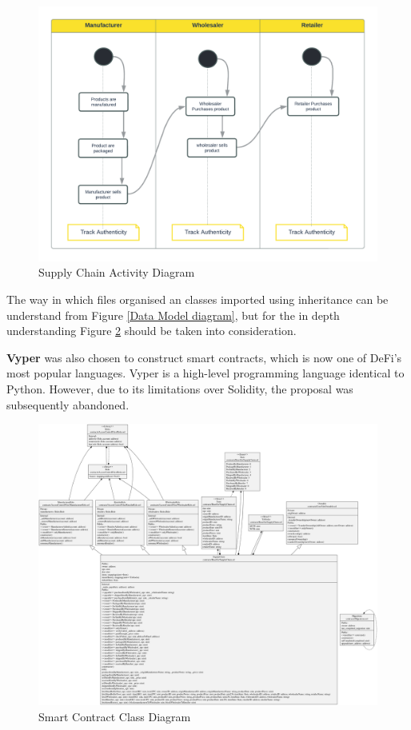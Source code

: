 \begin{figure}[h]
\centering
  \includegraphics[width=12cm]{includes/figures/Activity Diagram.png} 
  \caption{Supply Chain Activity Diagram}
  \label{Activity Diagram}
\end{figure}

\vspace{.5cm}

The way in which files organised an classes imported using inheritance can be understand from Figure \ref{Data Model diagram}, but for the in depth understanding Figure \ref{Overall Class Diagram} should be taken into consideration.

\vspace{.5cm}
\textbf{Vyper} was also chosen to construct smart contracts, which is now one of \ac{DeFi}'s most popular languages. Vyper is a high-level programming language identical to Python. However, due to its limitations over Solidity, the proposal was subsequently abandoned.

\newpage

\begin{figure}[h]
\centering
  \includegraphics[width=22cm, angle=90]{includes/figures/OverallClassDiagram.png} 
  \caption{Smart Contract Class Diagram}
  \label{Overall Class Diagram}
\end{figure}

